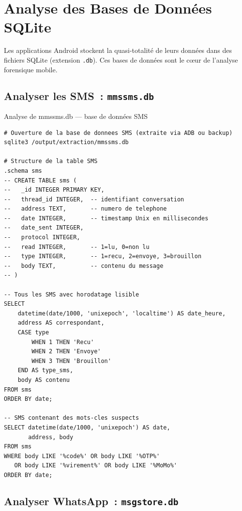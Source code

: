 \section{Analyse des Bases de Données SQLite}
\label{sec:sqlite}

Les applications Android stockent la quasi-totalité de leurs données
dans des fichiers SQLite (extension \texttt{.db}). Ces bases de données
sont le c\oe ur de l'analyse forensique mobile.

\subsection{Analyser les SMS~: \texttt{mmssms.db}}

\begin{boxoutils}{Analyse de mmssms.db --- base de données SMS}
\begin{lstlisting}[language=bash_forensique]
# Ouverture de la base de donnees SMS (extraite via ADB ou backup)
sqlite3 /output/extraction/mmssms.db

# Structure de la table SMS
.schema sms
-- CREATE TABLE sms (
--   _id INTEGER PRIMARY KEY,
--   thread_id INTEGER,  -- identifiant conversation
--   address TEXT,       -- numero de telephone
--   date INTEGER,       -- timestamp Unix en millisecondes
--   date_sent INTEGER,
--   protocol INTEGER,
--   read INTEGER,       -- 1=lu, 0=non lu
--   type INTEGER,       -- 1=recu, 2=envoye, 3=brouillon
--   body TEXT,          -- contenu du message
-- )

-- Tous les SMS avec horodatage lisible
SELECT
    datetime(date/1000, 'unixepoch', 'localtime') AS date_heure,
    address AS correspondant,
    CASE type
        WHEN 1 THEN 'Recu'
        WHEN 2 THEN 'Envoye'
        WHEN 3 THEN 'Brouillon'
    END AS type_sms,
    body AS contenu
FROM sms
ORDER BY date;

-- SMS contenant des mots-cles suspects
SELECT datetime(date/1000, 'unixepoch') AS date,
       address, body
FROM sms
WHERE body LIKE '%code%' OR body LIKE '%OTP%'
   OR body LIKE '%virement%' OR body LIKE '%MoMo%'
ORDER BY date;
\end{lstlisting}
\end{boxoutils}

\subsection{Analyser WhatsApp~: \texttt{msgstore.db}}

